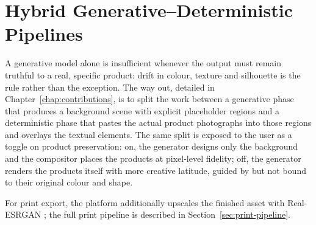 \section{Hybrid Generative--Deterministic Pipelines}
\label{sec:hybrid}

A generative model alone is insufficient whenever the output must remain truthful to a real, specific product: drift in colour, texture and silhouette is the rule rather than the exception. The way out, detailed in Chapter~\ref{chap:contributions}, is to split the work between a generative phase that produces a background scene with explicit placeholder regions and a deterministic phase that pastes the actual product photographs into those regions and overlays the textual elements. The same split is exposed to the user as a toggle on product preservation: on, the generator designs only the background and the compositor places the products at pixel-level fidelity; off, the generator renders the products itself with more creative latitude, guided by but not bound to their original colour and shape.

For print export, the platform additionally upscales the finished asset with Real-ESRGAN \cite{wang2021realesrgan}; the full print pipeline is described in Section~\ref{sec:print-pipeline}.

